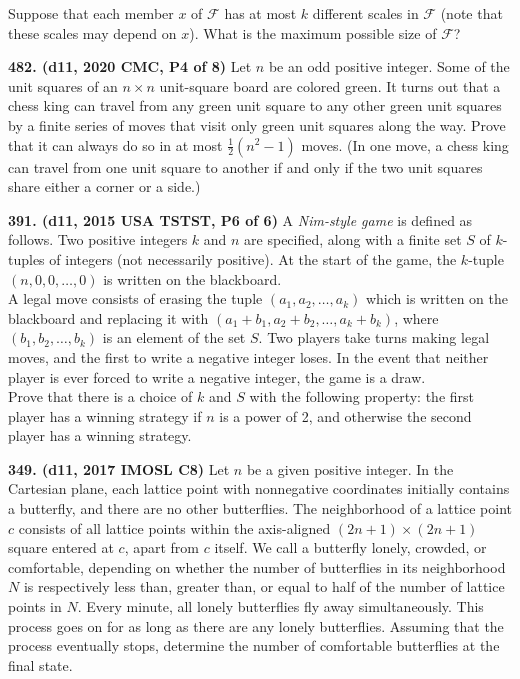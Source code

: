 \documentclass{article}
\begin{document}
Suppose that each member $x$ of $\mathcal F$ has at most $k$ different scales in $\mathcal F$ (note that these scales may depend on $x$). What is the maximum possible size of $\mathcal F$?

\textbf{482. (\color{red}d11\color{black}, 2020 CMC, P4 of 8)} Let $n$ be an odd positive integer. Some of the unit squares of an $n \times n$ unit-square board are colored green. It turns out that a chess king can travel from any green unit square to any other green unit squares by a finite series of moves that visit only green unit squares along the way. Prove that it can always do so in at most $\frac 12 (n^2-1)$ moves. (In one move, a chess king can travel from one unit square to another if and only if the two unit squares share either a corner or a side.)

\textbf{391. (\color{red}d11\color{black}, 2015 USA TSTST, P6 of 6)} A \emph{Nim-style game} is defined as follows. Two positive integers $k$ and $n$ are specified, along with a finite set $S$ of $k$-tuples of integers (not necessarily positive). At the start of the game, the $k$-tuple $(n, 0, 0, \ldots, 0)$ is written on the blackboard.\\[5pt]
A legal move consists of erasing the tuple $(a_1,a_2, \ldots,a_k)$ which is written on the blackboard and replacing it with $(a_1+b_1, a_2+b_2,  \ldots, a_k+b_k)$, where $(b_1, b_2,  \ldots, b_k)$ is an element of the set $S$. Two players take turns making legal moves, and the first to write a negative integer loses. In the event that neither player is ever forced to write a negative integer, the game is a draw.\\[5pt]
Prove that there is a choice of $k$ and $S$ with the following property: the first player has a winning strategy if $n$ is a power of 2, and otherwise the second player has a winning strategy.

\textbf{349. (\color{red}d11\color{black}, 2017 IMOSL C8)} Let $n$ be a given positive integer. In the Cartesian plane, each lattice point with nonnegative coordinates initially contains a butterfly, and there are no other butterflies. The neighborhood of a lattice point $c$ consists of all lattice points within the axis-aligned $(2n+1) \times (2n+1)$ square entered at $c$, apart from $c$ itself. We call a butterfly lonely, crowded, or comfortable, depending on whether the number of butterflies in its neighborhood $N$ is respectively less than, greater than, or equal to half of the number of lattice points in $N$. Every minute, all lonely butterflies fly away simultaneously. This process goes on for as long as there are any lonely butterflies. Assuming that the process eventually stops, determine the number of comfortable butterflies at the final state.
\end{document}

